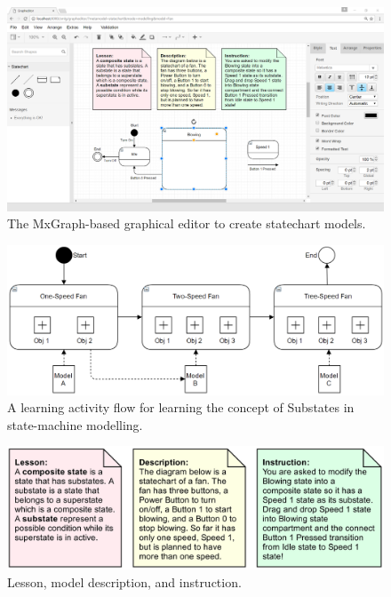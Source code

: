 \documentclass[conference]{IEEEtran}
\begin{document}
\begin{figure}[!t]
\centering
\includegraphics[width=\linewidth]{ide}
\caption{The MxGraph-based graphical editor to create statechart models.}
\label{ide}
\end{figure}

\begin{figure}[!t]
\centering
\includegraphics[width=\linewidth]{eoml}
\caption{A learning activity flow for learning the concept of Substates in state-machine modelling.}
\label{eoml}
\end{figure}

\begin{figure}[!t]
\centering
\includegraphics[width=\linewidth]{example-01a}
\caption{Lesson, model description, and instruction.}
\label{example-01a}
\end{figure}
\end{document}
